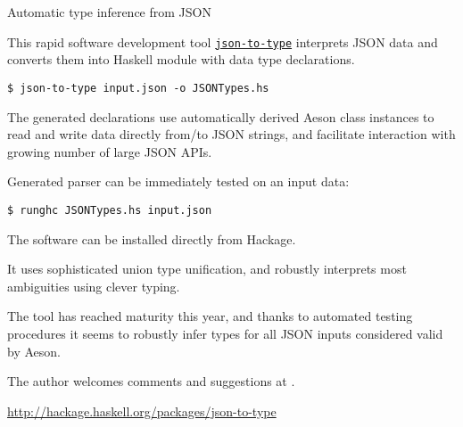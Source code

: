 \begin{hcarentry}[new]{Automatic type inference from JSON}
\label{jsonautotype}
\makeheader

This rapid software development tool \href{https://github.com/mgajda/json-to-type}{\texttt{json-to-type}} interprets JSON
data and converts them into Haskell module with data type declarations.

\begin{verbatim}
$ json-to-type input.json -o JSONTypes.hs
\end{verbatim}

The generated declarations use automatically derived Aeson class instances
to read and write data directly from/to JSON strings,
and facilitate interaction with growing number of large JSON APIs.

Generated parser can be immediately tested on an input data:

\begin{verbatim}
$ runghc JSONTypes.hs input.json
\end{verbatim}

The software can be installed directly from Hackage.

It uses sophisticated union type unification, and robustly
interprets most ambiguities using clever typing.

The tool has reached maturity this year, and thanks to automated testing procedures it seems to robustly infer types
for all JSON inputs considered valid by Aeson.

The author welcomes comments and suggestions at .

\FurtherReading
\url{http://hackage.haskell.org/packages/json-to-type}
\end{hcarentry}
